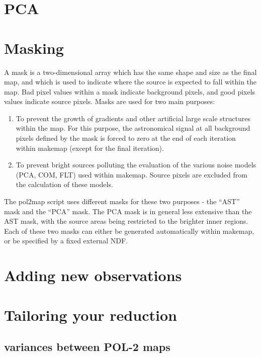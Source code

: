 \cite{smurf}

\section{PCA}


\section{Masking}
A mask is a two-dimensional array which has the same shape and size as the final map, and
which is used to indicate where the source is expected to fall within the map. Bad pixel values
within a mask indicate background pixels, and good pixels values indicate source pixels. Masks
are used for two main purposes:

\begin{enumerate}\itemsep-0.2em
\item To prevent the growth of gradients and other artificial large scale structures within the
map.  For this purpose, the astronomical signal at all background pixels defined by the
mask is forced to zero at the end of each iteration within makemap (except for the final iteration).
\item To prevent bright sources polluting the evaluation of the various noise models (PCA, COM, FLT) used within
makemap. Source pixels are excluded from the calculation of these models.
\end{enumerate}


The pol2map script uses different masks for these two purposes - the “AST” mask and the “PCA” mask. 
The PCA mask is in general less extensive than the AST mask, with the source areas being restricted to the brighter inner regions.
Each of these two masks can either be generated automatically within makemap, or be specified by
a fixed external NDF. 

\section{Adding new observations}



\section{Tailoring your reduction}

\subsection*{variances between POL-2 maps}

